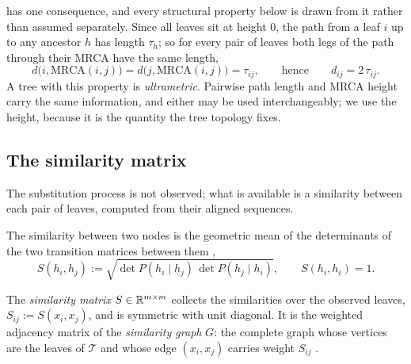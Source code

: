\noindent {} has one consequence, and every structural property below
is drawn from it rather than assumed separately. Since all leaves sit at height $0$,
the path from a leaf $i$ up to any ancestor $h$ has length $\tau_h$; so for every
pair of leaves both legs of the path through their MRCA have the same length,
\begin{equation}\label{eq:ultrametric}
   d\bigl(i, \mathrm{MRCA}(i,j)\bigr) = d\bigl(j, \mathrm{MRCA}(i,j)\bigr) = \tau_{ij},
   \qquad\text{hence}\qquad
   d_{ij} = 2\,\tau_{ij}.
\end{equation}
A tree with this property is \emph{ultrametric}. Pairwise path length and MRCA
height carry the same information, and either may be used interchangeably; we use
the height, because it is the quantity the tree topology fixes.

\subsection{The similarity matrix}\label{sec:model-similarity}

The substitution process is not observed; what is available is a similarity between
each pair of leaves, computed from their aligned sequences.

\begin{definition}\label{def:similarity}
The similarity between two nodes is the geometric mean of the determinants of the
two transition matrices between them \cite{aizenbud2023spectral},
\begin{equation}\label{eq:similarity_def}
   S(h_i, h_j) := \sqrt{\det P(h_i \mid h_j)\,\det P(h_j \mid h_i)},
   \qquad S(h_i,h_i) = 1 .
\end{equation}
\end{definition}

\begin{definition}\label{def:simgraph}
The \emph{similarity matrix} $S \in \mathbb{R}^{m \times m}$ collects the similarities over
the observed leaves, $S_{ij} := S(x_i, x_j)$, and is symmetric with unit diagonal.
It is the weighted adjacency matrix of the \emph{similarity graph} $G$: the complete
graph whose vertices are the leaves of $\mathcal{T}$ and whose edge $(x_i,x_j)$
carries weight $S_{ij}$ \cite{aizenbud2023spectral}.
\end{definition}

